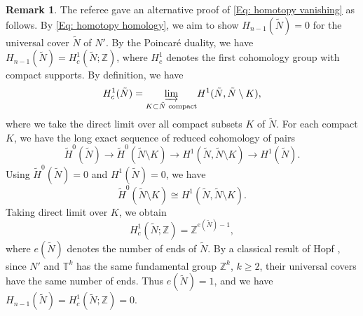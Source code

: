 \documentclass[11pt,letterpaper]{amsart}
\numberwithin{equation}{section}
\theoremstyle{definition}
\newtheorem{remark}[theorem]{Remark}
\begin{document}
{
\begin{remark}
    The referee gave an alternative proof of \eqref{Eq: homotopy vanishing} as follows. By \eqref{Eq: homotopy homology}, we aim to show $H_{n-1}(\tilde N)=0$ for the universal cover $\tilde N$ of $N'$.
    By the Poincar\'e duality, we have $H_{n-1}(\tilde{N}) = H^1_c (\tilde{N}; \mathbb{Z})$, where $H_c^1$ denotes the first cohomology group with compact supports. By definition, we have $$H^1_c (\tilde{N}) = \underset{K \subset \tilde{N} \text{ compact}}{\varinjlim} H^1(\tilde{N}, \tilde{N} \setminus K),$$ where we take the direct limit over all compact subsets $K$ of $\tilde{N}$. For each compact $K$, we have the long exact sequence of reduced cohomology of pairs
$$\tilde{H}^0(\tilde{N}) \to \tilde{H}^0(\tilde{N}\setminus K) \to H^1(\tilde N,\tilde{N}\setminus K) \to H^1 (\tilde{N}).$$
Using $\tilde{H}^0(\tilde{N}) = 0$ and $H^1 (\tilde{N}) = 0$, we have
$$\tilde{H}^0(\tilde{N}\setminus K) \cong H^1(\tilde N,\tilde{N}\setminus K).$$
Taking direct limit over $K$, we obtain
$$  H^1_c (\tilde{N};\mathbb Z)=\mathbb Z^{e(\tilde{N}) - 1},$$
where $e(\tilde{N})$ denotes the number of ends of $\tilde{N}$.
By a classical result of Hopf \cite{Hop43}, since $N'$ and $\mathbb T^k$ has the same fundamental group $\mathbb Z^k$, $k \ge 2$, their universal covers have the same number of ends. Thus $e(\tilde{N}) = 1$, and we have $H_{n-1}(\tilde{N}) = H^1_c (\tilde{N}; \mathbb{Z})=0$.


\end{remark}
}
\end{document}

